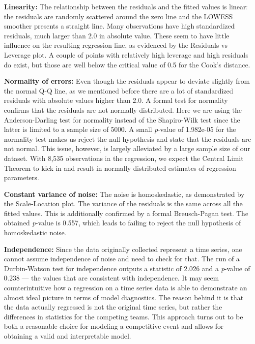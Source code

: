 \documentclass[
    12pt,
    a4paper,
    titlepage,  %
    abstract,  %
    headings=standardclasses,  %
    bibliography=totocnumbered  %
]{scrartcl}
\begin{document}
\textbf{Linearity:} The relationship between the residuals and the fitted values is linear: the residuals are randomly scattered around the zero line and the LOWESS smoother presents a straight line. Many observations have high standardized residuals, much larger than 2.0 in absolute value. These seem to have little influence on the resulting regression line, as evidenced by the Residuals vs Leverage plot. A couple of points with relatively high leverage and high residuals do exist, but those are well below the critical value of 0.5 for the Cook's distance. 

\textbf{Normality of errors:} Even though the residuals appear to deviate slightly from the normal Q-Q line, as we mentioned before there are a lot of standardized residuals with absolute values higher than 2.0. A formal test for normality confirms that the residuals are not normally distributed. Here we are using the Anderson-Darling test for normality instead of the Shapiro-Wilk test since the latter is limited to a sample size of 5000. A small \emph{p}-value of 1.982e-05 for the normality test makes us reject the null hypothesis and state that the residuals are not normal. This issue, however, is largely alleviated by a large sample size of our dataset. With 8,535 observations in the regression, we expect the Central Limit Theorem to kick in and result in normally distributed estimates of regression parameters.

\textbf{Constant variance of noise:} The noise is homoskedastic, as demonstrated by the Scale-Location plot. The variance of the residuals is the same across all the fitted values. This is additionally confirmed by a formal Breusch-Pagan test. The obtained \emph{p}-value is 0.557, which leads to failing to reject the null hypothesis of homoskedastic noise.

\textbf{Independence:} Since the data originally collected represent a time series, one cannot assume independence of noise and need to check for that. The run of a Durbin-Watson test for independence outputs a statistic of 2.026 and a \emph{p}-value of 0.238 — the values that are consistent with independence. It may seem counterintuitive how a regression on a time series data is able to demonstrate an almost ideal picture in terms of model diagnostics. The reason behind it is that the data actually regressed is not the original time series, but rather the differences in statistics for the competing teams. This approach turns out to be both a reasonable choice for modeling a competitive event and allows for obtaining a valid and interpretable model.
\end{document}
